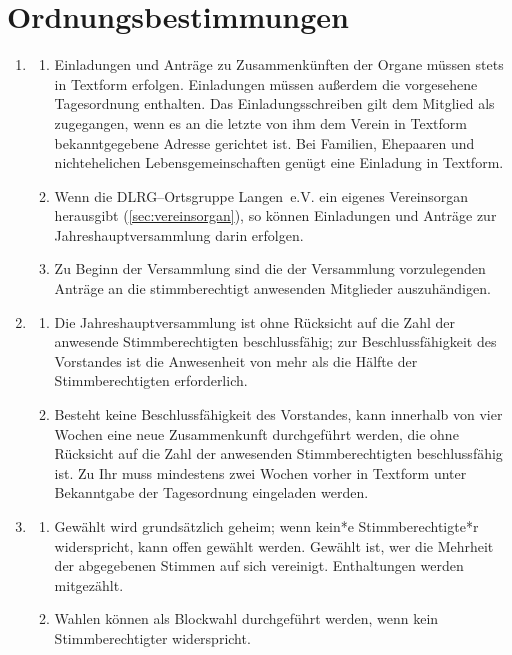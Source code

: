 \documentclass[%
12pt, %
a4paper, %
headsepline, %
parskip, %
headings=normal, %
]{scrreprt}
\begin{document}
\section{Ordnungsbestimmungen}
\label{sec:ordnungsbestimmungen}
\begin{enumerate}
    \item \begin{enumerate}[noitemsep]
        \item Einladungen und Anträge zu Zusammenkünften der Organe müssen stets in Textform erfolgen. Einladungen müssen außerdem die vorgesehene Tagesordnung enthalten. Das Einladungsschreiben gilt dem Mitglied als zugegangen, wenn es an die letzte von ihm dem Verein in Textform bekanntgegebene Adresse gerichtet ist. Bei Familien, Ehepaaren und nichtehelichen Lebensgemeinschaften genügt eine Einladung in Textform.
        \item Wenn die DLRG--Ortsgruppe Langen~e.V. ein eigenes Vereinsorgan herausgibt (\ref{sec:vereinsorgan}), so können Einladungen und Anträge zur Jahreshauptversammlung darin erfolgen.
        \item Zu Beginn der Versammlung sind die der Versammlung vorzulegenden Anträge an die stimmberechtigt anwesenden Mitglieder auszuhändigen.
      \end{enumerate}
    \item \begin{enumerate}[noitemsep]
        \item Die Jahreshauptversammlung ist ohne Rücksicht auf die Zahl der anwesende Stimmberechtigten beschlussfähig; zur Beschlussfähigkeit des Vorstandes ist die Anwesenheit von mehr als die Hälfte der Stimmberechtigten erforderlich. 
        \item Besteht keine Beschlussfähigkeit des Vorstandes, kann innerhalb von vier Wochen eine neue Zusammenkunft durchgeführt werden, die ohne Rücksicht auf die Zahl der anwesenden Stimmberechtigten beschlussfähig ist. Zu Ihr muss mindestens zwei Wochen vorher in Textform unter Bekanntgabe der Tagesordnung eingeladen werden.
      \end{enumerate}
    \item \begin{enumerate}[noitemsep]
        \item Gewählt wird grundsätzlich geheim; wenn kein*e Stimmberechtigte*r widerspricht, kann offen gewählt werden. Gewählt ist, wer die Mehrheit der abgegebenen Stimmen auf sich vereinigt. Enthaltungen werden mitgezählt.
        \item Wahlen können als Blockwahl durchgeführt werden, wenn kein Stimmberechtigter widerspricht.

\end{enumerate}
\end{enumerate}
\end{document}
